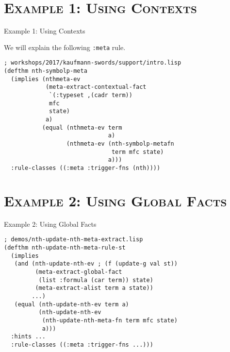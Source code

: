 \section{\scshape Example 1: Using Contexts}
\begin{frame}[fragile]{Example 1: Using Contexts}

We will explain the following {\tt :meta} rule.

\begin{verbatim}
; workshops/2017/kaufmann-swords/support/intro.lisp
(defthm nth-symbolp-meta
  (implies (nthmeta-ev
            (meta-extract-contextual-fact
             `(:typeset ,(cadr term))
             mfc
             state)
            a)
           (equal (nthmeta-ev term
                              a)
                  (nthmeta-ev (nth-symbolp-metafn
                               term mfc state)
                              a)))
  :rule-classes ((:meta :trigger-fns (nth))))
\end{verbatim}

\end{frame}
\section{\scshape Example 2: Using Global Facts}
\begin{frame}[fragile]{Example 2: Using Global Facts}

\begin{verbatim}
; demos/nth-update-nth-meta-extract.lisp
(defthm nth-update-nth-meta-rule-st
  (implies
   (and (nth-update-nth-ev ; (f (update-g val st))
         (meta-extract-global-fact
          (list :formula (car term)) state)
         (meta-extract-alist term a state))
        ...)
   (equal (nth-update-nth-ev term a)
          (nth-update-nth-ev
           (nth-update-nth-meta-fn term mfc state)
           a)))
  :hints ...
  :rule-classes ((:meta :trigger-fns ...)))
\end{verbatim}

\end{frame}
